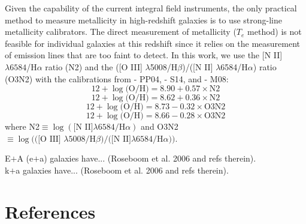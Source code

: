 \documentclass[11pt]{article}
\begin{document}
Given the capability of the current integral field instruments, the only practical method to measure metallicity in high-redshift galaxies is to use strong-line metallicity calibrators. The direct measurement of metallicity ($T_e$ method) is not feasible for individual galaxies at this redshift since it relies on the measurement of emission lines that are too faint to detect. In this work, we use the [N II] $\lambda6584$/H$\alpha$ ratio (N2) and the  ([O III] $\lambda$5008/H$\beta$)/([N II] $\lambda$6584/H$\alpha$) ratio (O3N2) with the calibrations from \citet{pp04} - PP04, \citet{Steidel14} - S14, and \citet{Maiolino08} - M08:
\begin{equation}
12+\log\textrm{(O/H)} = 8.90+0.57\times \textrm{N2} \tag{N2, PP04}
\end{equation}
\begin{equation}
12+\log\textrm{(O/H)} = 8.62+0.36\times \textrm{N2} \tag{N2, S14}
\end{equation}
\begin{equation}
12+\log\textrm{(O/H)} = 8.73-0.32\times \textrm{O3N2} \tag{O3N2, PP04}
\end{equation}
\begin{equation}
12+\log\textrm{(O/H)} = 8.66-0.28\times \textrm{O3N2} \tag{O3N2, S14}
\end{equation}
where N2$\equiv \log(\textrm{[N II]} \lambda6584/\textrm{H}\alpha)$ and O3N2$ \equiv \log\textrm{(([O III] }\lambda5008/\textrm{H}\beta)/\textrm{([N II]}\lambda6584\textrm{/H}\alpha))$. 


\noindent
E$+$A (e$+$a) galaxies have... (Roseboom et al. 2006 and refs therein).\\
k$+$a         galaxies have... (Roseboom et al. 2006 and refs therein).\\



\section{References}
\end{document}
